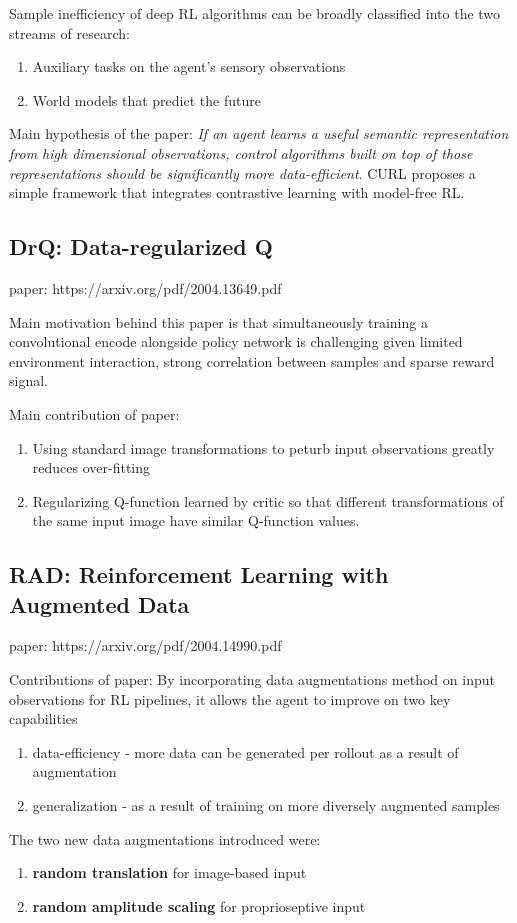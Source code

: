 \documentclass[11pt]{article} %
\begin{document}
Sample inefficiency of deep RL algorithms can be broadly classified into the two streams of research:
\begin{enumerate}
    \item Auxiliary tasks on the agent's sensory observations
    \item World models that predict the future
\end{enumerate}

Main hypothesis of the paper: \emph{If an agent learns a useful semantic representation from high dimensional observations, control algorithms built on top of those representations should be significantly more data-efficient}. CURL proposes a simple framework that integrates contrastive learning with model-free RL.

\subsection{DrQ: Data-regularized Q}
paper: https://arxiv.org/pdf/2004.13649.pdf

Main motivation behind this paper is that simultaneously training a convolutional encode alongside policy network is challenging given limited environment interaction, strong correlation between samples and sparse reward signal.

Main contribution of paper: 
\begin{enumerate}
    \item Using standard image transformations to peturb input observations greatly reduces over-fitting
    \item Regularizing Q-function learned by critic so that different transformations of the same input image have similar Q-function values.
\end{enumerate}

\subsection{RAD: Reinforcement Learning with Augmented Data}
paper: https://arxiv.org/pdf/2004.14990.pdf

Contributions of paper: By incorporating data augmentations method on input observations for RL pipelines, it allows the agent to improve on two key capabilities
\begin{enumerate}
    \item data-efficiency - more data can be generated per rollout as a result of augmentation
    \item generalization - as a result of training on more diversely augmented samples
\end{enumerate}
The two new data augmentations introduced were:
\begin{enumerate}
    \item \textbf{random translation} for image-based input
    \item \textbf{random amplitude scaling} for proprioseptive input
\end{enumerate}
\end{document}
